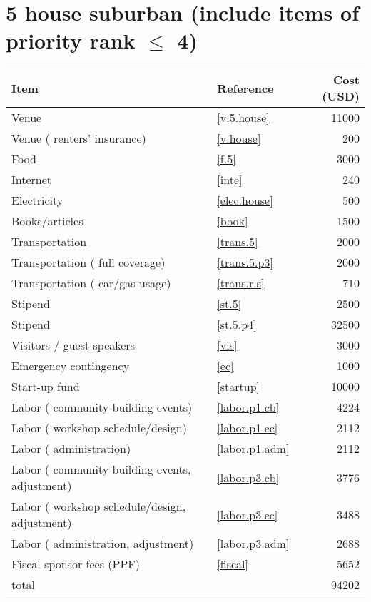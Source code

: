 \section*{5 house suburban (include items of priority rank $\leq$ 4)}
\begin{center}
\begin{tabular}{llr}
Item & Reference & Cost (USD) \\ \hline
Venue & \ref{v.5.house} & 11000 \\
Venue ( renters' insurance) & \ref{v.house} & 200 \\
Food & \ref{f.5} & 3000 \\
Internet & \ref{inte} & 240 \\
Electricity & \ref{elec.house} & 500 \\
Books/articles & \ref{book} & 1500 \\
Transportation & \ref{trans.5} & 2000 \\
Transportation ( full coverage) & \ref{trans.5.p3} & 2000 \\
Transportation ( car/gas usage) & \ref{trans.r.s} & 710 \\
Stipend & \ref{st.5} & 2500 \\
Stipend & \ref{st.5.p4} & 32500 \\
Visitors / guest speakers & \ref{vis} & 3000 \\
Emergency contingency & \ref{ec} & 1000 \\
Start-up fund & \ref{startup} & 10000 \\
Labor ( community-building events) & \ref{labor.p1.cb} & 4224 \\
Labor ( workshop schedule/design) & \ref{labor.p1.ec} & 2112 \\
Labor ( administration) & \ref{labor.p1.adm} & 2112 \\
Labor ( community-building events, adjustment) & \ref{labor.p3.cb} & 3776 \\
Labor ( workshop schedule/design, adjustment) & \ref{labor.p3.ec} & 3488 \\
Labor ( administration, adjustment) & \ref{labor.p3.adm} & 2688 \\
Fiscal sponsor fees (PPF) & \ref{fiscal} & 5652 \\ \hline
total &  & 94202
\end{tabular}
\end{center}
\newpage
